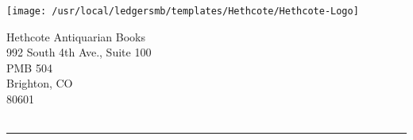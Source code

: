 \parbox{\textwidth}{%
  \parbox[b]{.65\textwidth}{
    \texttt{[image: /usr/local/ledgersmb/templates/Hethcote/Hethcote-Logo]}
  }
  \parbox[b]{.42\textwidth}{%
  Hethcote Antiquarian Books\\
  992 South 4th Ave., Suite 100\\
  PMB 504\\
  Brighton, CO\\
               80601\\
  }\hfill
  \begin{tabular}[b]{rr@{}}
  \end{tabular}

  \rule[1.5em]{\textwidth}{0.5pt}
}

